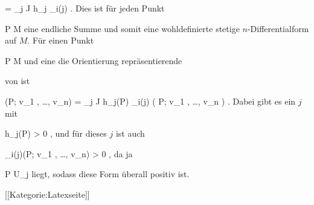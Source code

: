 {{\mavergleichskettedisp
{\vergleichskette
{ \omega
}
{ =} { \sum_{j \in J} h_j \omega_{i(j)}
}
{ } {
}
{ } {
}
{ } {
}
}
{}{}{.}
Dies ist für jeden Punkt

\mavergleichskette
{\vergleichskette
{ P
}
{ \in }{ M
}
{  }{
}
{    }{
}
{   }{
}
}
{}{}{}
eine endliche Summe und somit eine wohldefinierte stetige $n$-Differentialform auf $M$. Für einen Punkt

\mavergleichskette
{\vergleichskette
{ P
}
{ \in }{ M
}
{  }{
}
{    }{
}
{   }{
}
}
{}{}{}
und eine die Orientierung repräsentierende

  von
 ist

\mavergleichskettedisp
{\vergleichskette
{ \omega(P; v_1 , \ldots , v_n)
}
{ =} { \sum_{j \in J} h_j(P) \omega_{i(j)} \left(  P; v_1 , \ldots , v_n  \right)
}
{ } {
}
{ } {
}
{ } {
}
}
{}{}{.}
Dabei gibt es ein $j$ mit

\mavergleichskette
{\vergleichskette
{ h_j(P)
}
{ > }{ 0
}
{  }{
}
{    }{
}
{   }{
}
}
{}{}{,}
und für dieses $j$ ist auch

\mavergleichskette
{\vergleichskette
{ \omega_{i(j)}(P; v_1 , \ldots , v_n)
}
{ > }{ 0
}
{  }{
}
{    }{
}
{   }{
}
}
{}{}{,}
da ja

\mavergleichskette
{\vergleichskette
{ P
}
{ \in }{ U_j
}
{  }{
}
{    }{
}
{   }{
}
}
{}{}{}
liegt, sodass diese Form überall positiv ist.}
{}

}

 [[Kategorie:Latexseite]]

